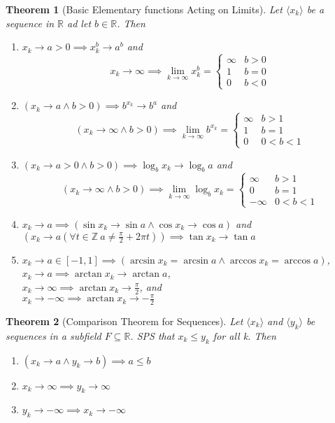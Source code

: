 \documentclass[11pt, oneside]{book}
\theoremstyle{break}
\newtheorem{thm}{Theorem}[section]
\newcommand{\bb}[1]{\mathbb{#1}}			%
\begin{document}
\begin{thm}[Basic Elementary functions Acting on Limits]
	Let $\langle x_k \rangle$ be a sequence in $\bb{R}$ ad let $b \in \bb{R}$. Then
	\begin{enumerate}
		\item $x_k \to a > 0 \implies x_k^b \to a^b$ and \\
			\[
				x_k \to \infty \implies \lim_{k \to \infty} x_k^b =
				\begin{cases}
					\infty 	& b > 0 \\
					1		& b = 0 \\
					0 		& b < 0
				\end{cases}
			\]
		\item $(x_k \to a \land b > 0) \implies b^{x_k} \to b^a$ and \\
			\[
				(x_k \to \infty \land b > 0) \implies \lim_{k \to \infty} b^{x_k} =
				\begin{cases}
					\infty 	& b > 1 \\
					1		& b = 1 \\
					0		& 0 < b < 1
				\end{cases}
			\]
		\item $(x_k \to a > 0 \land b > 0) \implies \log_b x_k \to \log_b a$ and \\
			\[
				(x_k \to \infty \land b > 0) \implies \lim_{k \to \infty} \log_b x_k = 
				\begin{cases}
					\infty 	& b > 1 \\
					0		& b = 1 \\
					-\infty & 0 < b < 1
				\end{cases}
			\]
		\item $x_k \to a \implies (\sin x_k \to \sin a \land \cos x_k \to \cos a)$ and \\
			  $(x_k \to a (\forall t \in \bb{Z} \> a \neq \frac{\pi}{2} + 2 \pi t)) \implies \tan x_k \to \tan a$
		\item $x_k \to a \in [-1, 1] \implies (\arcsin x_k = \arcsin a \land \arccos x_k = \arccos a)$, \\
			  $x_k \to a \implies \arctan x_k \to \arctan a$, \\
			  $x_k \to \infty \implies \arctan x_k \to \frac{\pi}{2}$, and \\
			  $x_k \to -\infty \implies \arctan x_k \to -\frac{\pi}{2}$
	\end{enumerate}
\end{thm}

\begin{thm}[Comparison Theorem for Sequences]\label{comparison_seq}
	Let $\langle x_k \rangle$ and $\langle y_k \rangle$ be sequences in a subfield $F \subseteq \bb{R}$. SPS that $x_k \leq y_k$ for all k. Then
	\begin{enumerate}
		\item $(x_k \to a \land y_k \to b) \implies a \leq b$
		\item $x_k \to \infty \implies y_k \to \infty$
		\item $y_k \to -\infty \implies x_k \to -\infty$
	\end{enumerate}
\end{thm}
\end{document}
